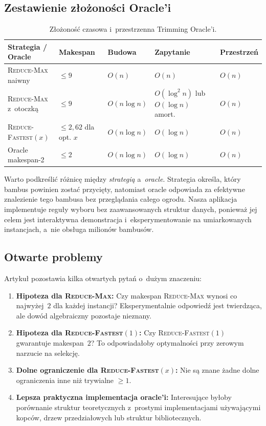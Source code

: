 \documentclass[12pt,a4paper]{article}
\theoremstyle{plain}
\theoremstyle{definition}
\theoremstyle{remark}
\newcommand{\RF}{\textsc{Reduce-Fastest}}
\newcommand{\RM}{\textsc{Reduce-Max}}
\begin{document}
\subsection{Zestawienie złożoności Oracle'i}

\begin{table}[htbp]
\centering
\caption{Złożoność czasowa i~przestrzenna Trimming Oracle'i.}
\label{tab:oracles}
\small
\begin{tabularx}{\textwidth}{@{}lYYYY@{}}
\toprule
\textbf{Strategia / Oracle} & \textbf{Makespan} & \textbf{Budowa}
  & \textbf{Zapytanie} & \textbf{Przestrzeń} \\
\midrule
\RM{} naiwny        & $\leq 9$    & $O(n)$        & $O(n)$ & $O(n)$ \\
\RM{} z~otoczką     & $\leq 9$    & $O(n\log n)$  & $O(\log^2 n)$ lub $O(\log n)$ amort. & $O(n)$ \\
\RF$(x)$            & $\leq 2{,}62$ dla opt. $x$ & $O(n\log n)$ & $O(\log n)$ & $O(n)$ \\
Oracle makespan-2   & $\leq 2$    & $O(n\log n)$  & $O(\log n)$ & $O(n)$ \\
\bottomrule
\end{tabularx}
\end{table}

Warto podkreślić różnicę między \emph{strategią} a~\emph{oracle}. Strategia
określa, który bambus powinien zostać przycięty, natomiast oracle odpowiada
za efektywne znalezienie tego bambusa bez przeglądania całego ogrodu.
Nasza aplikacja implementuje reguły wyboru bez zaawansowanych struktur danych,
ponieważ jej celem jest interaktywna demonstracja i~eksperymentowanie na
umiarkowanych instancjach, a~nie obsługa milionów bambusów.

\subsection{Otwarte problemy}

Artykuł pozostawia kilka otwartych pytań o~dużym znaczeniu:

\begin{enumerate}[noitemsep]
  \item \textbf{Hipoteza dla \RM:} Czy makespan \RM{} wynosi co najwyżej~$2$
        dla każdej instancji? Eksperymentalnie odpowiedź jest twierdząca,
        ale dowód algebraiczny pozostaje nieznany.
  \item \textbf{Hipoteza dla \RF$(1)$:} Czy \RF$(1)$ gwarantuje
        makespan~$2$? To odpowiadałoby optymalności przy zerowym narzucie
        na selekcję.
  \item \textbf{Dolne ograniczenie dla \RF$(x)$:} Nie są znane żadne
        dolne ograniczenia inne niż trywialne $\geq 1$.
  \item \textbf{Lepsza praktyczna implementacja oracle'i:} Interesujące
        byłoby porównanie struktur teoretycznych z~prostymi implementacjami
        używającymi kopców, drzew przedziałowych lub struktur bibliotecznych.
\end{enumerate}
\end{document}
